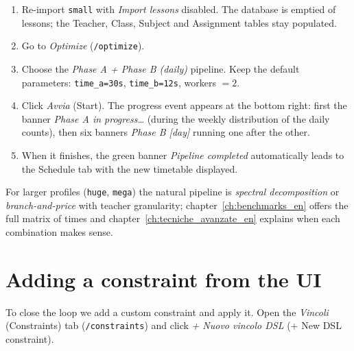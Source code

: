 \begin{enumerate}
\item Re-import \texttt{small} with \emph{Import lessons}
  disabled. The database is emptied of lessons; the Teacher,
  Class, Subject and Assignment tables stay populated.
\item Go to \emph{Optimize} (\texttt{/optimize}).
\item Choose the \emph{Phase A + Phase B (daily)} pipeline. Keep
  the default parameters: \texttt{time\_a=30s},
  \texttt{time\_b=12s}, workers $= 2$.
\item Click \emph{Avvia} (Start). The progress event appears at
  the bottom right: first the banner \emph{Phase A in progress\ldots}
  (during the weekly distribution of the daily counts), then six
  banners \emph{Phase B [day]} running one after the other.
\item When it finishes, the green banner \emph{Pipeline completed}
  automatically leads to the Schedule tab with the new timetable
  displayed.
\end{enumerate}


For larger profiles (\texttt{huge}, \texttt{mega}) the natural
pipeline is \emph{spectral decomposition} or
\emph{branch-and-price} with teacher granularity; chapter~\ref{ch:benchmarks_en}
offers the full matrix of times and chapter~\ref{ch:tecniche_avanzate_en}
explains when each combination makes sense.

\section{Adding a constraint from the UI}


To close the loop we add a custom constraint and apply it. Open
the \emph{Vincoli} (Constraints) tab (\texttt{/constraints}) and
click \emph{+ Nuovo vincolo DSL} (+ New DSL constraint).

